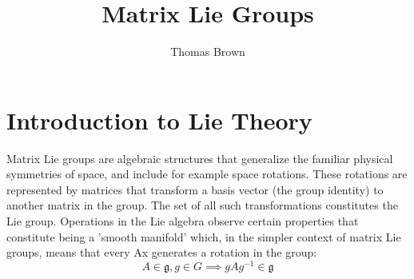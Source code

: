 \documentclass{article}
\title{Matrix Lie Groups}
\begin{document}
\author{Thomas Brown}
\maketitle


\section{Introduction to Lie Theory}
Matrix Lie groups are algebraic structures that generalize the familiar physical symmetries of space, and include for example space rotations. These rotations are represented by matrices that transform a basis vector (the group identity) to another matrix in the group. The set of all such transformations constitutes the Lie group. Operations in the Lie algebra observe certain properties that constitute being a 'smooth manifold' which, in the simpler context of matrix Lie groups, means that every Ax generates a rotation in the group: \[A \in \mathfrak{g}, g \in G \implies gAg^{-1} \in \mathfrak{g}\]
\end{document}
